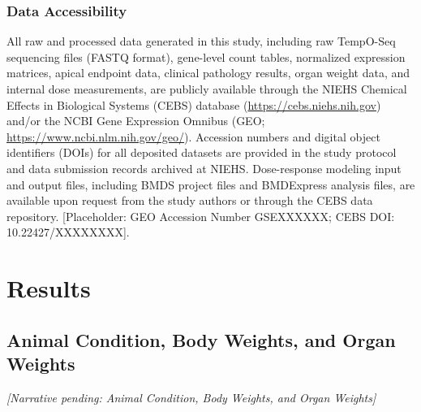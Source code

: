 \subsubsection{Data Accessibility}

All raw and processed data generated in this study, including raw TempO-Seq sequencing files (FASTQ format), gene-level count tables, normalized expression matrices, apical endpoint data, clinical pathology results, organ weight data, and internal dose measurements, are publicly available through the NIEHS Chemical Effects in Biological Systems (CEBS) database (\url{https://cebs.niehs.nih.gov}) and/or the NCBI Gene Expression Omnibus (GEO; \url{https://www.ncbi.nlm.nih.gov/geo/}). Accession numbers and digital object identifiers (DOIs) for all deposited datasets are provided in the study protocol and data submission records archived at NIEHS. Dose-response modeling input and output files, including BMDS project files and BMDExpress analysis files, are available upon request from the study authors or through the CEBS data repository. [Placeholder: GEO Accession Number GSEXXXXXX; CEBS DOI: 10.22427/XXXXXXXX].

\section{Results}

\subsection{Animal Condition, Body Weights, and Organ Weights}

\emph{[Narrative pending: Animal Condition, Body Weights, and Organ Weights]}

